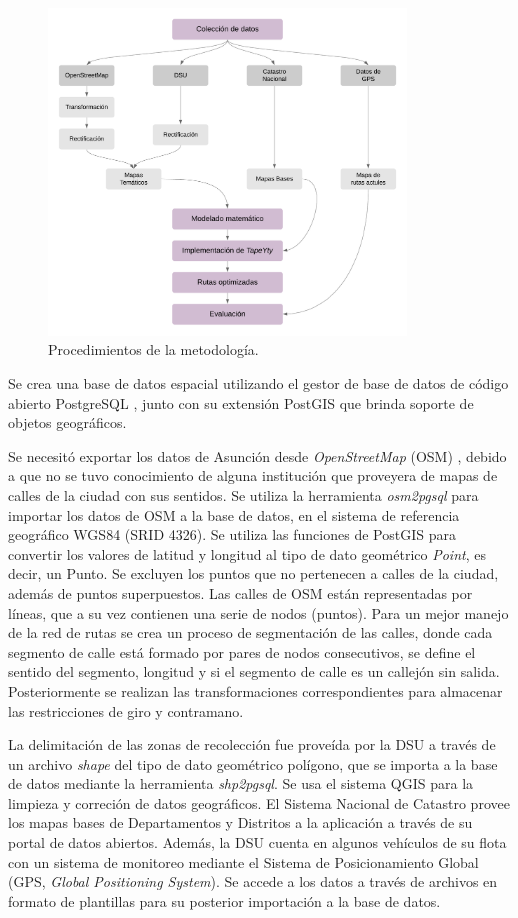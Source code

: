 \documentclass[conference,compsoc]{IEEEtran}
\begin{document}
\begin{figure}[tbp]
\centerline{\includegraphics[width=9.5cm]{imagenes/DiagramaDeMetodologia.png}}
\caption{Procedimientos de la metodología.}
\label{fig:metodologia}
\end{figure}

Se crea una base de datos espacial utilizando el gestor de base de datos de código abierto PostgreSQL \cite{PostgreSQL}, junto con su extensión PostGIS \cite{PostGIS} que brinda soporte de objetos geográficos.

Se necesitó exportar los datos de Asunción desde \textit{OpenStreetMap} (OSM) \cite{OpenStreetMap}, debido a que no se tuvo conocimiento de alguna institución que proveyera de mapas de calles de la ciudad con sus sentidos. Se utiliza la herramienta \textit{osm2pgsql} para importar los datos de OSM a la base de datos, en el sistema de referencia geográfico WGS84 (SRID 4326). Se utiliza las funciones de PostGIS para convertir los valores de latitud y longitud al tipo de dato geométrico \textit{Point}, es decir, un Punto. Se excluyen los puntos que no pertenecen a calles de la ciudad, además de puntos superpuestos. Las calles de OSM están representadas por líneas, que a su vez contienen una serie de nodos (puntos). Para un mejor manejo de la red de rutas se crea un proceso de segmentación de las calles, donde cada segmento de calle está formado por pares de nodos consecutivos, se define el sentido del segmento, longitud y si el segmento de calle es un callejón sin salida. Posteriormente se realizan las transformaciones correspondientes para almacenar las restricciones de giro y contramano.

La delimitación de las zonas de recolección fue proveída por la DSU a través de un archivo \textit{shape} del tipo de dato geométrico polígono, que se importa a la base de datos mediante la herramienta \textit{shp2pgsql}. Se usa el sistema QGIS para la limpieza y correción de datos geográficos. El Sistema Nacional de Catastro provee los mapas bases de Departamentos y Distritos a la aplicación a través de su portal de datos abiertos. Además, la DSU cuenta en  algunos  vehículos  de  su  flota con un sistema de monitoreo mediante el Sistema de Posicionamiento Global (GPS, \textit{Global Positioning System}). Se accede a los datos a través de archivos en formato de plantillas para su posterior importación a la base de datos.
\end{document}
